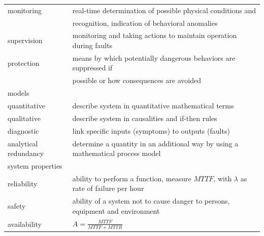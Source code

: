 \begin{table}[!h]
\begin{tabular}{@{}ll@{}}
        monitoring            & real-time determination of possible physical conditions and                          \\                & recognition, indication of behavioral anomalies                                                                                           \\
        supervision          & monitoring and taking actions to maintain operation during faults                                        \\
        protection           & means by which potentially dangerous behaviors are suppressed if                                          \\            & possible or how consequences are avoided                                       \\ \bottomrule
        models &           \\ \midrule
        quantitative     & describe system in quantitative mathematical terms                                                                                           \\
        qualitative           & describe system in causalities and if-then rules \\
        diagnostic                & link specific inputs (symptoms) to outputs (faults)             \\
        analytical redundancy          & determine a quantity in an additional way by using a mathematical process model                                                              \\ \bottomrule
        system properties               &                                                                           \\ \midrule
        reliability                   & ability to perform a function, measure $MTTF$, with $\lambda$ as rate of failure per hour                                                                            \\
        safety        & ability of a system not to cause danger to persons, equipment and environment                                                                      \\
        availability          & $A=\frac{MTTF}{MTTF + MTTR}$                                                                       \\ \bottomrule


\end{tabular}
\end{table}
